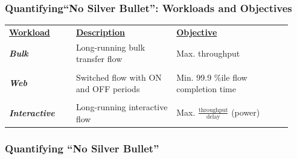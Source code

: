 \begin{Large}
\begin{frame}[plain]
\frametitle{Quantifying``No Silver Bullet'': Workloads and Objectives}

\begin{table}
\begin{tabular}{|p{0.22\linewidth}|p{0.33\linewidth}|p{0.38\linewidth}|}
\hline
{\bf \underline{Workload}} & {\bf \underline{Description}} & {\bf \underline{Objective}} \\
\textbf{\emph{Bulk}} & Long-running bulk transfer flow & Max. throughput \\
& &\\
\textbf{\emph{Web}} & Switched flow with ON and OFF periods &
Min. 99.9 \%ile flow completion time \\
& &\\
\textbf{\emph{Interactive}} & Long-running interactive flow & Max. $\frac{\mbox{throughput}}{\mbox{delay}}$ (power) \\ 
\hline
\end{tabular}
\end{table}
\end{frame}

\begin{frame}[plain]
\frametitle{Quantifying ``No Silver Bullet''}



\end{frame}
\end{Large}
